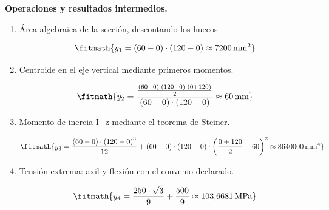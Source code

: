 \noindent\textbf{Operaciones y resultados intermedios.}

\begin{enumerate}

\item Área algebraica de la sección, descontando los huecos.

\[\fitmath{y_{1}=\left(60-0\right)\cdot \left(120-0\right)\approx 7200\,\mathrm{mm^{2}}}\]

\item Centroide en el eje vertical mediante primeros momentos.

\[\fitmath{y_{2}=\frac{\frac{\left(60-0\right)\cdot \left(120-0\right)\cdot \left(0+120\right)}{2}}{\left(60-0\right)\cdot \left(120-0\right)}\approx 60\,\mathrm{mm}}\]

\item Momento de inercia I\_z mediante el teorema de Steiner.

\[\fitmath{y_{3}=\frac{\left(60-0\right)\cdot {\left(120-0\right)}^{3}}{12}+\left(60-0\right)\cdot \left(120-0\right)\cdot {\left(\frac{0+120}{2}-60\right)}^{2}\approx 8640000\,\mathrm{mm^{4}}}\]

\item Tensión extrema: axil y flexión con el convenio declarado.

\[\fitmath{y_{4}=\frac{250\cdot \sqrt{3}}{9}+\frac{500}{9}\approx 103{,}6681\,\mathrm{MPa}}\]

\end{enumerate}
